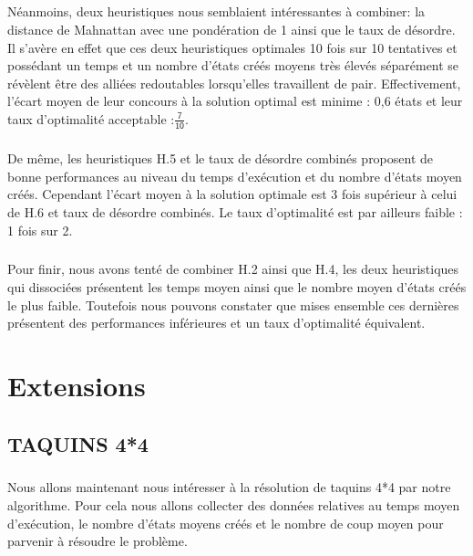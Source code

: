 \documentclass[10pt,a4paper]{report}
\begin{document}
\paragraph{}{Néanmoins, deux heuristiques nous semblaient intéressantes à combiner: la distance de Mahnattan avec une pondération de 1 ainsi que le taux de désordre. Il s'avère en effet que ces deux heuristiques optimales 10 fois sur 10 tentatives et possédant un temps et un nombre d'états créés moyens très élevés séparément se révèlent être des alliées redoutables lorsqu'elles travaillent de pair. Effectivement, l'écart moyen de leur concours à la solution optimal est minime : 0,6 états et leur taux d'optimalité acceptable :$\mathsf{\tfrac{7}{10}}$.}

\paragraph{}{De même, les heuristiques H.5 et le taux de désordre combinés proposent de bonne performances au niveau du temps d'exécution et du nombre d'états moyen créés. Cependant l'écart moyen à la solution optimale est 3 fois supérieur à celui de H.6 et taux de désordre combinés. Le taux d'optimalité est par ailleurs faible : 1 fois sur 2.}

\paragraph{}{Pour finir, nous avons tenté de combiner H.2 ainsi que H.4, les deux heuristiques qui dissociées présentent les temps moyen ainsi que le nombre moyen d'états créés le plus faible. Toutefois nous pouvons constater que mises ensemble ces dernières présentent des performances inférieures et un taux d'optimalité équivalent.}
\chapter{Extensions}
\section{TAQUINS 4*4}

\paragraph{}{Nous allons maintenant nous intéresser à la résolution de taquins 4*4 par notre algorithme. Pour cela nous allons collecter des données relatives au temps moyen d'exécution, le nombre d'états moyens créés et le nombre de coup moyen pour parvenir à résoudre le problème.}
\end{document}
